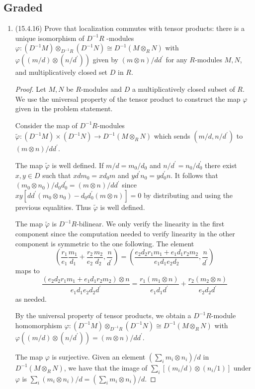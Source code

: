 \documentclass[11pt]{article}
\newcommand{\br}[1]{\left(#1\right)}
\begin{document}
\subsection*{Graded}
\begin{enumerate}
    \item (15.4.16) Prove that localization commutes with tensor products: there is a unique isomorphism of $D^{-1}R$ -modules $\varphi\colon (D^{-1}M)\otimes_{D^{-1}R} (D^{-1}N)\cong D^{-1}(M\otimes_R N)$ with $\varphi((m/d)\otimes(n/d^\prime))$ given by $(m\otimes n)/dd^\prime$ for any $R$-modules $M,N$, and multiplicatively closed set $D$ in $R$. \begin{proof}
        Let $M,N$ be $R$-modules and $D$ a multiplicatively closed subset of $R$. We use the universal property of the tensor product to construct the map $\varphi$ given in the problem statement. 

        Consider the map of $D^{-1}R$-modules $\tilde{\varphi}\colon (D^{-1}M)\times (D^{-1}N)\to D^{-1}(M\otimes_R N)$ which sends $(m/d,n/d^\prime)$ to $(m\otimes n)/dd^\prime$.
        
        The map $\tilde{\varphi}$ is well defined. If $m/d = m_0/d_0$ and $n/d^\prime = n_0/d^\prime_0$ there exist $x,y\in D$ such that $xdm_0 = xd_0m$ and $yd^\prime n_0 = yd^\prime_0n$. It follows that $(m_0\otimes n_0)/d_0d_0^\prime = (m\otimes n)/dd^\prime$ since $xy[dd^\prime(m_0\otimes n_0) - d_0d_0^\prime(m\otimes n)] = 0$ by distributing and using the previous equalities. Thus $\tilde{\varphi}$ is well defined. 

        The map $\tilde{\varphi}$ is $D^{-1}R$-bilinear. We only verify the linearity in the first component since the computation needed to verify linearity in the other component is symmetric to the one following. The element \[\br{\frac{r_1}{e_1}\frac{m_1}{d_1}+\frac{r_2}{e_2}\frac{m_2}{d_2},\frac{n}{d^\prime}} = \br{\frac{e_2d_2r_1m_1 + e_1d_1r_2m_2}{e_1d_1e_2d_2},\frac{n}{d^\prime}}\] maps to \[\frac{(e_2d_2r_1m_1 + e_1d_1r_2m_2)\otimes n}{e_1d_1e_2d_2d^\prime} = \frac{r_1(m_1\otimes n)}{e_1d_1d^\prime} + \frac{r_2(m_2\otimes n)}{e_2d_2d^\prime}\] as needed.

        By the universal property of tensor products, we obtain a $D^{-1}R$-module homomorphism $\varphi\colon (D^{-1}M)\otimes_{D^{-1}R} (D^{-1}N)\cong D^{-1}(M\otimes_R N)$ with $\varphi((m/d)\otimes(n/d^\prime)) = (m\otimes n)/dd^\prime$.

        The map $\varphi$ is surjective. Given an element $(\sum_i m_i\otimes n_i)/d$ in $D^{-1}(M\otimes_R N)$, we have that the image of $\sum_i [(m_i/d)\otimes (n_i/1)]$ under $\varphi$ is $\sum_i( m_i\otimes n_i)/d=(\sum_i m_i\otimes n_i)/d$.


\end{proof}
\end{enumerate}
\end{document}
